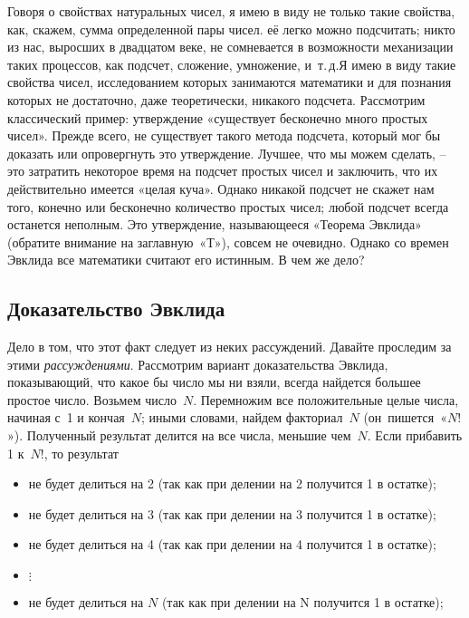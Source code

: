 \documentclass[../main.tex]{subfiles}
\begin{document}
Говоря о свойствах натуральных чисел, я имею в виду не только такие свойства, как, скажем, сумма определенной пары чисел. её легко можно подсчитать; никто из нас, выросших в двадцатом веке, не сомневается в возможности механизации таких процессов, как подсчет, сложение, умножение, и~т.\,д.\@ Я имею в виду такие свойства чисел, исследованием которых занимаются математики и для познания которых не достаточно, даже теоретически, никакого подсчета. Рассмотрим классический пример: утверждение «существует бесконечно много простых чисел». Прежде всего, не существует такого метода подсчета, который мог бы доказать или опровергнуть это утверждение. Лучшее, что мы можем сделать, \--- это затратить некоторое время на подсчет простых чисел и заключить, что их действительно имеется «целая куча». Однако никакой подсчет не скажет нам того, конечно или бесконечно количество простых чисел; любой подсчет всегда останется неполным. Это утверждение, называющееся «Теорема Эвклида» (обратите внимание на заглавную~«Т»), совсем не очевидно. Однако со времен Эвклида все математики считают его истинным. В чем же дело?



\subsection{Доказательство Эвклида}

Дело в том, что этот факт следует из неких рассуждений. Давайте проследим за этими \emph{рассуждениями}. Рассмотрим вариант доказательства Эвклида, показывающий, что какое бы число мы ни взяли, всегда найдется большее простое число. Возьмем число~$N$. Перемножим все положительные целые числа, начиная с~1 и кончая~$N$; иными словами, найдем факториал~$N$ (он~пишется~«$N!$»). Полученный результат делится на все числа, меньшие чем~$N$. Если прибавить 1 к~$N!$, то результат
%
\begin{itemize}[label={}, noitemsep, topsep=6pt]
    \item не будет делиться на 2 (так как при делении на 2 получится 1 в остатке);
    \item не будет делиться на 3 (так как при делении на 3 получится 1 в остатке);
    \item не будет делиться на 4 (так как при делении на 4 получится 1 в остатке);
    \item $\vdots$
    \item не будет делиться на $N$ (так как при делении на N получится 1 в остатке);
\end{itemize}
\end{document}
